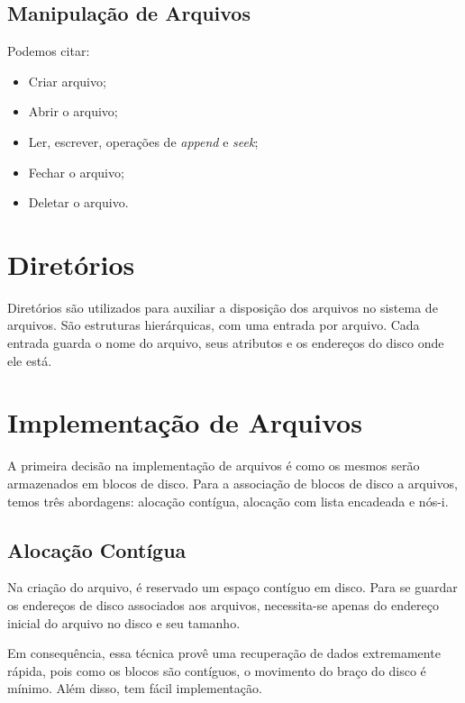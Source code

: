 \subsection{Manipulação de Arquivos}
Podemos citar:
\begin{itemize}
  \item Criar arquivo;
  \item Abrir o arquivo;
  \item Ler, escrever, operações de \textit{append} e \textit{seek};
  \item Fechar o arquivo;
  \item Deletar o arquivo.
\end{itemize}










\section{Diretórios}
Diretórios são utilizados para auxiliar a disposição dos arquivos no sistema de arquivos. São estruturas hierárquicas, com uma entrada por arquivo. Cada entrada guarda o nome do arquivo, seus atributos e os endereços do disco onde ele está.







\section{Implementação de Arquivos}
A primeira decisão na implementação de arquivos é como os mesmos serão armazenados em blocos de disco. Para a associação de blocos de disco a arquivos, temos três abordagens: alocação contígua, alocação com lista encadeada e nós-i.





\subsection{Alocação Contígua}
Na criação do arquivo, é reservado um espaço contíguo em disco. Para se guardar os endereços de disco associados aos arquivos, necessita-se apenas do endereço inicial do arquivo no disco e seu tamanho.

Em consequência, essa técnica provê uma recuperação de dados extremamente rápida, pois como os blocos são contíguos, o movimento do braço do disco é mínimo. Além disso, tem fácil implementação.

